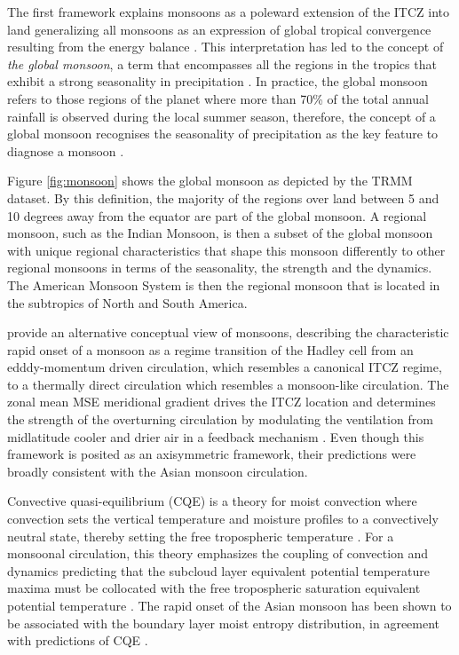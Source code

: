 The first framework  explains monsoons as a poleward extension of the ITCZ into land  generalizing all monsoons as an expression of global tropical convergence resulting from the energy balance \citep{chao2001origin,gadgil2018}. This interpretation has led to the concept of \textit{the global monsoon}, a term that encompasses all the regions in the tropics that exhibit a strong seasonality in precipitation \citep{zhou2016,gadgil2018}. 
In practice, the global monsoon refers to those regions of the planet where more than 70\% of the total annual rainfall is observed during the local summer season, therefore, the concept of a global monsoon recognises the seasonality of precipitation as the key feature to diagnose a monsoon \citep{zhou2016,wang2017}.

Figure \ref{fig:monsoon} shows the global monsoon as depicted by the TRMM dataset. By this definition, the majority of the regions over land between 5 and 10 degrees away from the equator are part of the global monsoon.
A regional monsoon, such as the Indian Monsoon, is then a subset of the global monsoon with unique regional characteristics that shape this monsoon differently to other regional monsoons in terms of the seasonality, the strength and the dynamics. 
The American Monsoon System is then the regional monsoon that is located in the subtropics of North and South America. 


\cite{bordoni2008monsoons} provide an alternative conceptual view of monsoons, describing the characteristic rapid onset of a monsoon as a regime transition of the Hadley cell from an edddy-momentum  driven circulation, which resembles a canonical ITCZ regime, to a thermally direct circulation which resembles a monsoon-like circulation. The zonal mean MSE meridional gradient drives the ITCZ location and determines the strength of the overturning circulation by modulating the ventilation from midlatitude cooler and drier air in a feedback mechanism \citep{geen2020}. Even though this framework is posited as an axisymmetric framework, their predictions were broadly consistent with the Asian monsoon circulation. 


Convective quasi-equilibrium (CQE) is a theory for moist convection where convection sets the vertical temperature and moisture profiles to a convectively neutral state, thereby setting the free tropospheric temperature \citep{neelin2007moist}. For a monsoonal circulation, this theory emphasizes the coupling of convection and dynamics predicting that the subcloud layer equivalent potential temperature maxima must be collocated with the free tropospheric saturation equivalent potential temperature \citep{nie2010observational,geen2020}. The rapid onset of the Asian monsoon has been shown to be associated with the boundary layer moist entropy distribution, in agreement with predictions of CQE \citep{nie2010observational,boos2015review,ma2019}.


